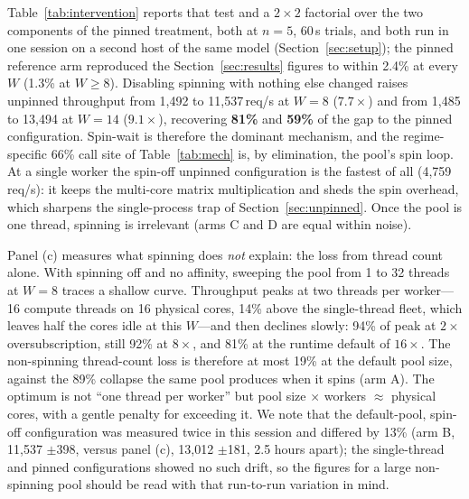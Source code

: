 \documentclass[conference]{IEEEtran}
\begin{document}
Table~\ref{tab:intervention} reports that test and a $2\times2$ factorial over the two components of the pinned treatment, both at $n{=}5$, 60\,s trials, and both run in one session on a second host of the same model (Section~\ref{sec:setup}); the pinned reference arm reproduced the Section~\ref{sec:results} figures to within 2.4\% at every $W$ (1.3\% at $W\geq8$). Disabling spinning with nothing else changed raises unpinned throughput from 1{,}492 to 11{,}537\,req/s at $W{=}8$ ($7.7\times$) and from 1{,}485 to 13{,}494 at $W{=}14$ ($9.1\times$), recovering \textbf{81\%} and \textbf{59\%} of the gap to the pinned configuration. Spin-wait is therefore the dominant mechanism, and the regime-specific 66\% call site of Table~\ref{tab:mech} is, by elimination, the pool's spin loop. At a single worker the spin-off unpinned configuration is the fastest of all (4{,}759\,req/s): it keeps the multi-core matrix multiplication and sheds the spin overhead, which sharpens the single-process trap of Section~\ref{sec:unpinned}. Once the pool is one thread, spinning is irrelevant (arms C and D are equal within noise).

Panel (c) measures what spinning does \emph{not} explain: the loss from thread count alone. With spinning off and no affinity, sweeping the pool from 1 to 32 threads at $W{=}8$ traces a shallow curve. Throughput peaks at two threads per worker---16 compute threads on 16 physical cores, 14\% above the single-thread fleet, which leaves half the cores idle at this $W$---and then declines slowly: 94\% of peak at $2\times$ oversubscription, still 92\% at $8\times$, and 81\% at the runtime default of $16\times$. The non-spinning thread-count loss is therefore at most 19\% at the default pool size, against the 89\% collapse the same pool produces when it spins (arm A). The optimum is not ``one thread per worker'' but pool size $\times$ workers $\approx$ physical cores, with a gentle penalty for exceeding it. We note that the default-pool, spin-off configuration was measured twice in this session and differed by 13\% (arm B, 11{,}537 $\pm$398, versus panel (c), 13{,}012 $\pm$181, 2.5 hours apart); the single-thread and pinned configurations showed no such drift, so the figures for a large non-spinning pool should be read with that run-to-run variation in mind.
\end{document}

